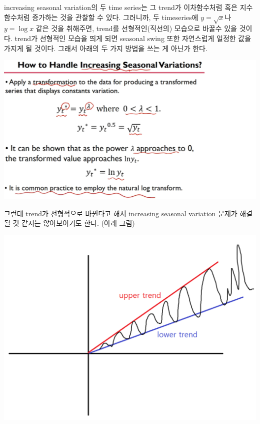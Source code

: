 \documentclass{article}
\begin{document}
increasing seasonal variation의 두 time series는 그 trend가 이차함수처럼 혹은 지수함수처럼 증가하는 것을 관찰할 수 있다.
그러니까, 두 timeseries에 \(y=\sqrt x\)나 \(y=\log x\) 같은 것을 취해주면, trend를 선형적인(직선의) 모습으로 바꿀수 있을 것이다.
trend가 선형적인 모습을 띄게 되면 seasonal swing 또한 자연스럽게 일정한 값을 가지게 될 것이다.
그래서 아래의 두 가지 방법을 쓰는 게 아닌가 한다.
\begin{center}
\includegraphics[width=.5\textwidth]{two_transforms}
\end{center}

그런데 trend가 선형적으로 바뀐다고 해서 increasing seasonal variation 문제가 해결될 것 같지는 않아보이기도 한다. (아래 그림)

\begin{center}
\includegraphics[width=.3\textwidth]{linear_upper_and_lower_trends}
\end{center}
\end{document}
